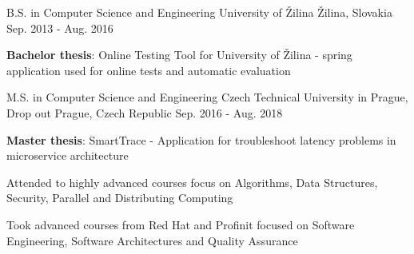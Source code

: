 

\begin{cventries}
  \cventry
    {B.S. in Computer Science and Engineering} %
    {University of Žilina} %
    {Žilina, Slovakia} %
    {Sep. 2013 - Aug. 2016} %
    {
      \begin{cvitems} %
        \item {\textbf{Bachelor thesis}: Online Testing Tool for University of Žilina - spring application used for online tests and automatic evaluation}
      \end{cvitems}
    }

\vspace{5pt}
  \cventry
    {M.S. in Computer Science and Engineering} %
    {Czech Technical University in Prague, Drop out} %
    {Prague, Czech Republic} %
    {Sep. 2016 - Aug. 2018} %
    {
      \begin{cvitems} %
        \item {\textbf{Master thesis}: SmartTrace - Application for troubleshoot latency problems in microservice architecture}
        \item {Attended to highly advanced courses focus on Algorithms, Data Structures, Security, Parallel and Distributing Computing}
        \item {Took advanced courses from Red Hat and Profinit focused on Software Engineering, Software Architectures and Quality Assurance}
      \end{cvitems}
    }

\end{cventries}
